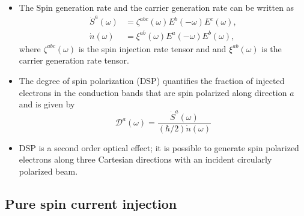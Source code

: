 \documentclass{beamer}
\begin{document}
\begin{frame}


{\small

\begin{itemize}

\item 
The Spin generation rate and the carrier generation rate can be written as
\vspace{-4mm}
\begin{align*}
\dot{S}^{a}(\omega)&= 
\zeta^{abc}(\omega)E^{b}(-\omega)E^{c}(\omega), \\
\dot{n}(\omega)&= 
\xi^{ab}(\omega)E^{a}(-\omega)E^{b}(\omega),
\end{align*}
where $\zeta^{abc}(\omega)$ is the spin injection rate tensor and and $\xi^
{ab}(\omega)$ is the carrier generation rate tensor.

\item 
The degree of spin polarization (DSP) quantifies the fraction of injected
electrons
in the conduction bands that are spin polarized along direction $a$ and is
given by
\vspace{-2mm}
\begin{equation}
\mathcal{D}^{a}(\omega)=
\frac{\dot{S}^{a}(\omega)}{(\hbar/2)\dot{n}(\omega)}
\end{equation}

\item 
DSP is a second order optical effect; it is possible to generate spin
polarized
electrons along three Cartesian directions with an incident circularly polarized
beam.


\end{itemize}
}


\end{frame}




\subsection{Pure spin current injection}
\end{document}
